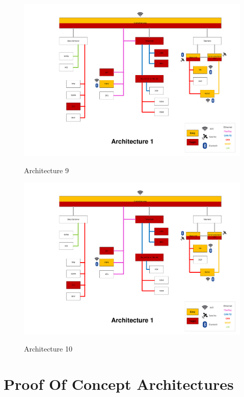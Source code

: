 \begin{figure}[h]
    \centering
    \caption{Architecture 9}
    \includegraphics[width=\textwidth, page=9]{../Architectures-survey.pdf}
    \label{fig:architecture9}
\end{figure}

\begin{figure}[h]
    \centering
    \caption{Architecture 10}
    \includegraphics[width=\textwidth, page=10]{../Architectures-survey.pdf}
    \label{fig:architecture10}
\end{figure}


\chapter{Proof Of Concept Architectures}
\label{pocarch}

